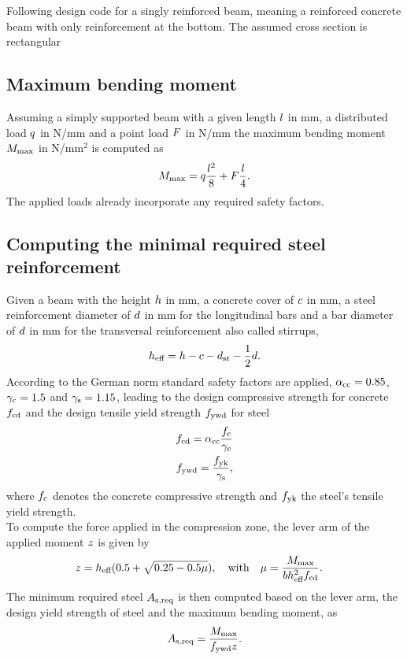 Following design code \citeauthor{DIN1992-1-1} for a singly reinforced beam, meaning a reinforced concrete beam with only reinforcement at the bottom.
The assumed cross section is rectangular

\subsection{Maximum bending moment}
Assuming a simply supported beam with a given length $l$ in mm, a distributed load $q$ in N/mm and a point load $F$ in N/mm
the maximum bending moment $M_{\text{max}}$ in N/mm$^2$ is computed as
\begin{align}
	M_{\text{max}}= q \frac{l^2}{8} + F \frac{l}{4}.
\end{align}
The applied loads already incorporate any required safety factors.
\subsection{Computing the minimal required steel reinforcement}
Given a beam with the height $h$ in mm, a concrete cover of $c$ in mm, a steel reinforcement diameter of $d$ in mm for the longitudinal bars and a bar diameter of $d$ in mm for the transversal reinforcement also called stirrups,
\begin{align}
	h_{\text{eff}} = h - c - d_{\text{st}} - \frac{1}{2} d.
\end{align}
According to the German norm standard safety factors are applied, $\alpha_{\text{cc}} = 0.85$, $\gamma_{\text{c}} = 1.5$ and $\gamma_{\text{s}} = 1.15$, leading to the design compressive strength for concrete $f_{\text{cd}}$ and  the design tensile yield strength $f_{\text{ywd}}$ for steel
\begin{align}
	f_{\text{cd}} = \alpha_{\text{cc}} \frac{f_{\text{c}} }{\gamma_{\text{c}}}\\
	f_{\text{ywd}} = \frac{f_{\text{yk}}}{\gamma_{\text{s}}},
\end{align}
where $f_{\text{c}}$ denotes the concrete compressive strength and $f_{\text{yk}}$ the steel's tensile yield strength.\\
To compute the force applied in the compression zone, the lever arm of the applied moment $z$ is given by 
\begin{align}
	z &= h_{\text{eff}}(0.5+\sqrt{0.25-0.5 \mu}),\quad \text{with}\quad
	\mu = \frac{M_{\text{max}} }{b h_{\text{eff}}^2 f_{\text{cd}}}. \label{eq:compr_str_constr}
\end{align}
The minimum required steel $A_{\text{s,req}}$ is then computed based on the lever arm, the design yield strength of steel and the maximum bending moment, as
\begin{align}
	A_{\text{s,req}} = \frac{M_{\text{max}}}{f_{\text{ywd}} z}.
\end{align}
